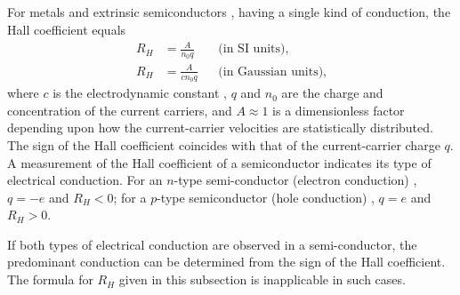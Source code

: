 \subsection{}\label{24.2.3} For metals and extrinsic semiconductors , having a single kind of conduction, the Hall coefficient equals
\begin{align*}%
R_{H} & = \frac{A }{n_{0}q} &&  \text{(in SI units),} \\
R_{H} & = \frac{A }{cn_{0}q} &&  \text{(in Gaussian units),}
\end{align*}
where $c$ is the electrodynamic constant , $q$ and $n_{0}$ are the charge and concentration of the current carriers, and $A \approx 1$ is a dimensionless factor depending upon how the current-carrier velocities are statistically distributed. The sign of the Hall coefficient coincides with that of the current-carrier charge $q$. A measurement of the Hall coefficient of a semiconductor indicates its type of electrical conduction. For an $n$-type semi­-conductor (electron conduction) , $q= -e$ and $R_{H}< 0$; for a $p$-type semiconductor (hole conduction) , $q = e$ and $R_{H} > 0$.

If both types of electrical conduction are observed in a semi-conductor, the predominant conduction can be determined from the sign of the Hall coefficient. The formula for $R_{H}$ given in
this subsection is inapplicable in such cases.

